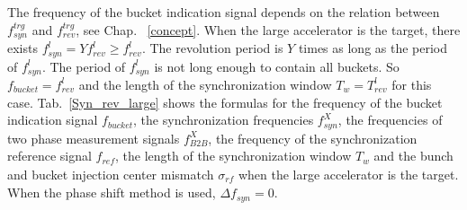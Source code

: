 The frequency of the bucket indication signal depends on the relation between $f_{\mathit{syn}}^{\mathit{trg}}$ and $f_{\mathit{rev}}^{\mathit{trg}}$, see Chap. ~\ref{concept}.
%
When the large accelerator is the target, there exists $f_{\mathit{syn}}^{l}=Yf_{\mathit{rev}}^{l}\ge f_{\mathit{rev}}^{l}$. The revolution period is $Y$ times as long as the period of $f_{\mathit{syn}}^{l}$. The period of $f_{\mathit{syn}}^{l}$ is not long enough to contain all buckets. So $f_\mathit{bucket}=f_{\mathit{rev}}^{l}$ and the length of the synchronization window $T_w=T_{\mathit{rev}}^{l}$ for this case. Tab.~\ref{Syn_rev_large} shows the formulas for the frequency of the bucket indication signal $f_\mathit{bucket}$, the synchronization frequencies $f_\mathit{syn}^\mathit{X}$, the frequencies of two phase measurement signals $f_\mathit{B2B}^\mathit{X}$, the frequency of the synchronization reference signal $f_\mathit{ref}$, the length of the synchronization window $T_w$ and the bunch and bucket injection center mismatch $\sigma_\mathit{rf}$ when the large accelerator is the target. When the phase shift method is used, $\Delta f_\mathit{syn}=0$.


